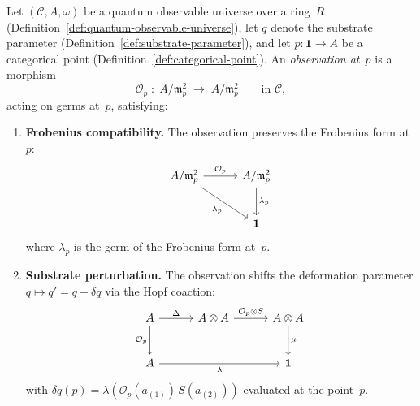 \begin{definition}[Observation]
\label{def:observation}
Let $(\mathcal{C}, A, \omega)$ be a quantum observable universe over a
ring~$R$ (Definition~\ref{def:quantum-observable-universe}), let $q$
denote the substrate parameter
(Definition~\ref{def:substrate-parameter}), and let
$p \colon \mathbf{1} \to A$ be a categorical point
(Definition~\ref{def:categorical-point}).  An
\emph{observation at~$p$} is a morphism
\[
  \mathcal{O}_p \;\colon\; A / \mathfrak{m}_p^2
  \;\longrightarrow\; A / \mathfrak{m}_p^2
  \qquad\text{in } \mathcal{C},
\]
acting on germs at~$p$, satisfying:
\begin{enumerate}
  \item \textbf{Frobenius compatibility.}\; The observation preserves
    the Frobenius form at~$p$:
    \begin{equation}\label{eq:observation-frobenius}
    \begin{tikzcd}[row sep=2.5em, column sep=3em]
      A / \mathfrak{m}_p^2 \ar[r, "\mathcal{O}_p"] \ar[dr, "\lambda_p"']
      & A / \mathfrak{m}_p^2 \ar[d, "\lambda_p"] \\
      & \mathbf{1}
    \end{tikzcd}
    \end{equation}
    where $\lambda_p$ is the germ of the Frobenius form at~$p$.
  \item \textbf{Substrate perturbation.}\; The observation shifts the
        deformation parameter $q \mapsto q' = q + \delta q$ via the
        Hopf coaction:
    \begin{equation}\label{eq:observation-substrate}
    \begin{tikzcd}[row sep=2.5em, column sep=3em]
      A \ar[r, "\Delta"] \ar[d, "\mathcal{O}_p"']
      & A \otimes A \ar[r, "\mathcal{O}_p \otimes S"]
      & A \otimes A \ar[d, "\mu"] \\
      A \ar[rr, "\lambda"']
      & & \mathbf{1}
    \end{tikzcd}
    \end{equation}
        with $\delta q(p) = \lambda(\mathcal{O}_p(a_{(1)})\,S(a_{(2)}))$
        evaluated at the point~$p$.
\end{enumerate}
\end{definition}

